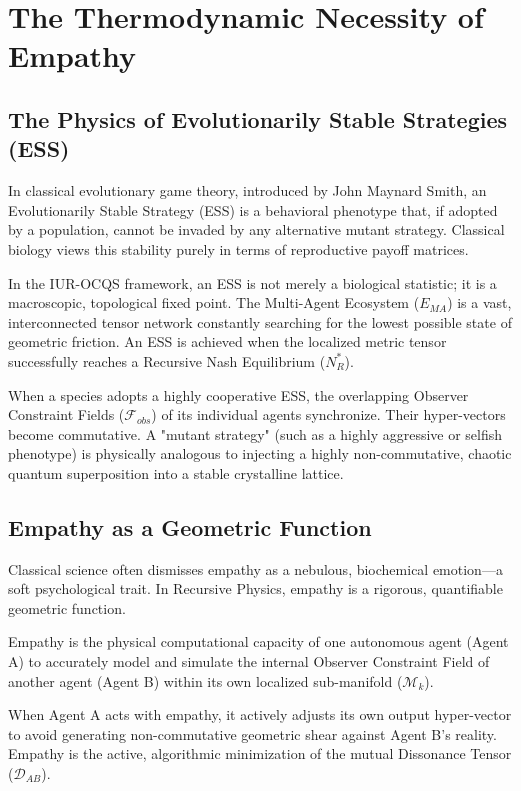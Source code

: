 \documentclass[12pt,openany]{book}
\begin{document}
\chapter{The Thermodynamic Necessity of Empathy}

\section{The Physics of Evolutionarily Stable Strategies (ESS)}
In classical evolutionary game theory, introduced by John Maynard Smith, an Evolutionarily Stable Strategy (ESS) is a behavioral phenotype that, if adopted by a population, cannot be invaded by any alternative mutant strategy. Classical biology views this stability purely in terms of reproductive payoff matrices. 

In the IUR-OCQS framework, an ESS is not merely a biological statistic; it is a macroscopic, topological fixed point. The Multi-Agent Ecosystem ($E_{MA}$) is a vast, interconnected tensor network constantly searching for the lowest possible state of geometric friction. An ESS is achieved when the localized metric tensor successfully reaches a Recursive Nash Equilibrium ($N^*_R$). 

When a species adopts a highly cooperative ESS, the overlapping Observer Constraint Fields ($\mathcal{F}_{obs}$) of its individual agents synchronize. Their hyper-vectors become commutative. A "mutant strategy" (such as a highly aggressive or selfish phenotype) is physically analogous to injecting a highly non-commutative, chaotic quantum superposition into a stable crystalline lattice.

\section{Empathy as a Geometric Function}
Classical science often dismisses empathy as a nebulous, biochemical emotion—a soft psychological trait. In Recursive Physics, empathy is a rigorous, quantifiable geometric function. 

Empathy is the physical computational capacity of one autonomous agent (Agent A) to accurately model and simulate the internal Observer Constraint Field of another agent (Agent B) within its own localized sub-manifold ($\mathcal{M}_k$). 

When Agent A acts with empathy, it actively adjusts its own output hyper-vector to avoid generating non-commutative geometric shear against Agent B's reality. Empathy is the active, algorithmic minimization of the mutual Dissonance Tensor ($\mathcal{D}_{AB}$). 
\end{document}

